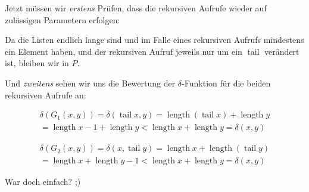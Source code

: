 \documentclass{article}
\DeclareMathOperator{\length}{length}
\DeclareMathOperator{\tail}{tail}
\begin{document}
Jetzt müssen wir \emph{erstens} Prüfen, dass die rekursiven Aufrufe wieder auf zulässigen Parametern erfolgen:

Da die Listen endlich lange sind und im Falle eines rekursiven Aufrufs mindestens ein Element haben, und der rekursiven Aufruf jeweils nur um ein $\tail$ verändert ist, bleiben wir in $P$.

Und \emph{zweitens} sehen wir uns die Bewertung der $\delta$-Funktion für die beiden rekursiven Aufrufe an:

\begin{gather*}
  \delta (G_1(x,y)) = \delta (\tail x, y) = \length ( \tail x) + \length y\\
   = \length x - 1 + \length y < \length x + \length y = \delta (x,y)
\end{gather*}

\begin{gather*}
  \delta (G_2(x,y)) = \delta (x, \tail y) = \length x + \length ( \tail y)\\
   = \length x + \length y - 1 < \length x + \length y = \delta (x,y)
\end{gather*}

War doch einfach? ;)
\end{document}
